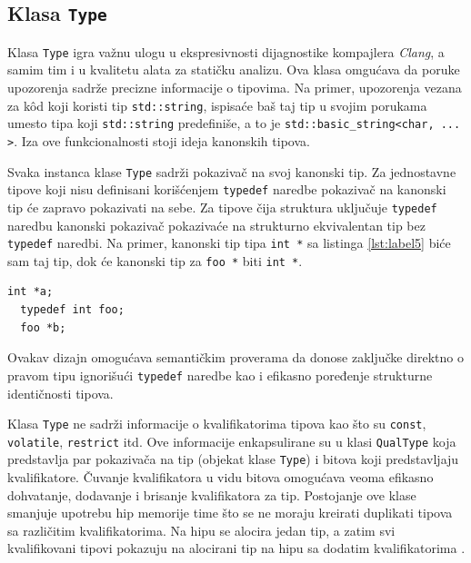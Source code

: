 \documentclass[12pt,oneside]{memoir}
\begin{document}
\subsection{Klasa \texttt{Type}}
  Klasa \texttt{Type} igra va\v{z}nu ulogu u ekspresivnosti dijagnostike kompajlera \textit{Clang}, a samim tim i u kvalitetu alata za stati\v{c}ku analizu. Ova klasa omgu\'{c}ava da poruke upozorenja sadr\v{z}e precizne informacije o tipovima. Na primer, upozorenja vezana za k\^{o}d koji koristi tip \texttt{std::string}, ispisa\'{c}e ba\v{s} taj tip u svojim porukama umesto tipa koji \texttt{std::string} predefini\v{s}e, a to je \texttt{std::basic\_string<char, ... >}. Iza ove funkcionalnosti stoji ideja kanonskih tipova.
  
  \par
  Svaka instanca klase \texttt{Type} sadr\v{z}i pokaziva\v{c} na svoj kanonski tip. Za jednostavne tipove koji nisu definisani kori\v{s}\'{c}enjem \texttt{typedef} naredbe pokaziva\v{c} na kanonski tip \'{c}e zapravo pokazivati na sebe. Za tipove \v{c}ija struktura uklju\v{c}uje \texttt{typedef} naredbu kanonski pokaziva\v{c} pokaziva\'{c}e na strukturno ekvivalentan tip bez \texttt{typedef} naredbi.
  Na primer, kanonski tip tipa \texttt{int *} sa listinga \ref{lst:label5}  bi\'{c}e sam taj tip, dok \'{c}e kanonski tip za \texttt{foo *} biti \texttt{int *}.

\begin{lstlisting}[style=customc, caption={Primer kanonskog tipa (\texttt{int *}) i tipa koji nije kanonski (\texttt{foo *}). },label=lst:label5]
  int *a;
  typedef int foo;
  foo *b;
\end{lstlisting}
  Ovakav dizajn omogu\'{c}ava semanti\v{c}kim proverama da donose zaklju\v{c}ke direktno o pravom tipu ignori\v{s}u\'{c}i \texttt{typedef} naredbe kao i efikasno poređenje strukturne identi\v{c}nosti tipova.

  \par
  Klasa \texttt{Type} ne sadr\v{z}i informacije o kvalifikatorima tipova kao \v{s}to su \texttt{const}, \texttt{volatile}, \texttt{restrict} itd. Ove informacije enkapsulirane su u klasi \texttt{QualType} koja predstavlja par pokaziva\v{c}a na tip (objekat klase \texttt{Type}) i bitova koji predstavljaju
  kvalifikatore. \v{C}uvanje kvalifikatora u vidu bitova omogu\'{c}ava veoma efikasno dohvatanje, dodavanje i brisanje kvalifikatora za tip. Postojanje ove klase smanjuje upotrebu hip memorije time \v{s}to se ne moraju kreirati duplikati tipova sa razli\v{c}itim kvalifikatorima. Na hipu se alocira jedan tip, a zatim 
  svi kvalifikovani tipovi pokazuju na alocirani tip na hipu sa dodatim kvalifikatorima \cite{CFEWebsite}.
\end{document}
